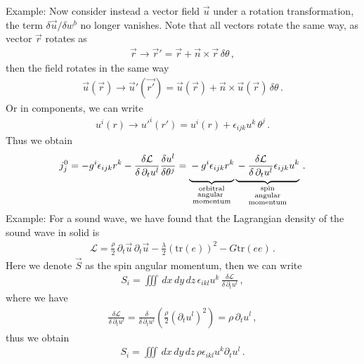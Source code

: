 \documentclass[11pt, onesided]{book}
\theoremstyle{break}
\theoremstyle{break}
\newcommand{\pd}{\partial}
\newcommand{\example}{\color{green}Example: \color{black}}
\begin{document}
\example Now consider instead a vector field $\vec{u}$ under a rotation transformation, the term $\delta\vec{u}/\delta w^b$ no longer vanishes. Note that all vectors rotate the same way, as vector $\vec{r}$ rotates as
\begin{align*}
\vec{r} \to \vec{r}' = \vec{r}+ \vec{n}\times \vec{r}\, \delta \theta\,,
\end{align*}
then the field rotates in the same way
\begin{align*}
\vec{u}(\vec{r}) \to \vec{u}'(\vec{r'})= \vec{u}(\vec{r}) + \vec{n}\times \vec{u}(\vec{r}) \, \delta \theta\,.
\end{align*}
Or in components, we can write
\begin{align*}
u^i(r) \to u'^i(r') = u^i(r) + \epsilon_{ijk}u^k\, \theta^j\,.
\end{align*}
Thus we obtain
\begin{align*}
j^0_j = -g^i \epsilon_{ijk}r^k - \frac{\delta \mathcal{L}}{\delta\, \pd_t u^l}\frac{\delta u^l}{\delta \theta^j}
=\underbrace{{\vphantom{\frac{a^l}{b_{ijk}}}} -g^i \epsilon_{ijk}r^k}_{\substack{\text{orbitral}\\ \text{angular } \\ \text{momentum}}} \underbrace{\vphantom{\frac{a^l}{b_{ijk}}} - \frac{\delta \mathcal{L}}{\delta\, \pd_t u^l}{\epsilon_{ijk}}u^k}_{\substack{\text{spin}\\ \text{angular}\\ \text{momentum}}}\,.
\end{align*}
\example For a sound wave, we have found that the Lagrangian density of the sound wave in solid is 
\begin{align*}
\mathcal{L} = \frac{\rho}{2}\, \pd_t \vec{u}\, \pd_t \vec{u} - \frac{\lambda}{2}(\text{tr}(e))^2 - G\text{tr}(ee)\,.
\end{align*}
Here we denote $\vec{S}$ as the spin angular momentum, then we can write
\begin{align*}
S_i = \iiint \, dx\, dy\, dz\, \epsilon_{ikl}u^k \, \frac{\delta \mathcal{L}}{\delta \,\pd_t u^l}\,,
\end{align*}
where we have
\begin{align*}
\frac{\delta \mathcal{L}}{\delta \, \pd_t u^l} = \frac{\delta}{\delta\,\pd_{t}u^l}\left( \frac{\rho}{2}(\pd_t u^l)^2\right) = \rho \, \pd_t u^l\,,
\end{align*}
thus we obtain
\begin{align*}
S_i = \iiint \, dx\, dy\, dz\, \rho\epsilon_{ikl}u^k\pd_tu^l\,.
\end{align*}
\end{document}
